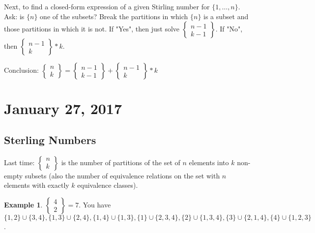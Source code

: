 \documentclass[12pt]{article}
\theoremstyle{definition}
\newtheorem{exmp}{Example}[section]
\begin{document}
Next, to find a closed-form expression of a given Stirling number for $\{1,
\ldots, n \}$. Ask: is $\{n \}$ one of the subsets? Break the partitions in
which $\{n\}$ is a subset and those partitions in which it is not. If "Yes",
then just solve $\begin{Bmatrix} n - 1 \\ k - 1\end{Bmatrix}$. If "No", then
$\begin{Bmatrix} n - 1 \\ k \end{Bmatrix} * k$.

Conclusion: $\begin{Bmatrix} n \\ k \end{Bmatrix} = \begin{Bmatrix} n - 1 \\ k
    - 1\end{Bmatrix} + \begin{Bmatrix} n - 1 \\ k \end{Bmatrix} * k$

\section{January 27, 2017}

\subsection{Sterling Numbers}

Last time: $\begin{Bmatrix}n \\ k\end{Bmatrix}$ is the number of partitions of
the set of $n$ elements into $k$ non-empty subsets (also the number of
equivalence relations on the set with $n$ elements with exactly $k$ equivalence
classes). 

\begin{exmp}
    $\begin{Bmatrix} 4 \\ 2 \end{Bmatrix} = 7$. You have $\{1, 2\} \cup \{3,
    4\}, \{1, 3\} \cup \{2, 4\}, \{1, 4\} \cup \{1, 3\}, \{1\} \cup \{2, 3, 4\},
    \{2\} \cup \{1, 3, 4\}, \{3\} \cup \{2, 1, 4\}, \{4\} \cup \{1, 2,3\}$.
\end{exmp}
\end{document}

